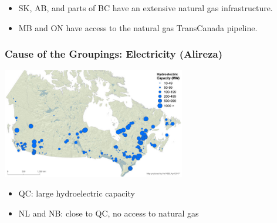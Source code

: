 \documentclass{beamer}
\begin{document}
\begin{frame}

\small
\begin{itemize}
	\item SK, AB, and parts of BC have an extensive natural gas infrastructure.
	\item MB and ON have access to the natural gas TransCanada pipeline.
\end{itemize}
\normalsize
\end{frame}


\begin{frame}
\frametitle{Cause of the Groupings: Electricity (Alireza)}
\begin{center}
\includegraphics[width=0.6\textwidth]{hydroPower.jpg}
\small
\end{center}
\begin{itemize}
	\item QC: large hydroelectric capacity
	\item  NL and NB: close to QC, no access to natural gas  
\end{itemize}
\normalsize
\end{frame}
\end{document}
